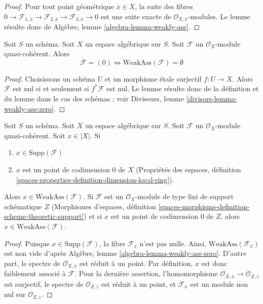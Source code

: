 \begin{proof}
Pour tout point géométrique $\overline{x} \in X$,
la suite des fibres
$0 \to \mathcal{F}_{1, \overline{x}} \to
\mathcal{F}_{2, \overline{x}} \to
\mathcal{F}_{3, \overline{x}} \to 0$
est une suite exacte de $\mathcal{O}_{X, \overline{x}}$-modules.
Le lemme résulte donc de
Algèbre, lemme \ref{algebra-lemma-weakly-ass}.
\end{proof}

\begin{lemma}
\label{lemma-weakly-ass-zero}
Soit $S$ un schéma. Soit $X$ un espace algébrique sur $S$.
Soit $\mathcal{F}$ un $\mathcal{O}_X$-module quasi-cohérent.
Alors
$$
\mathcal{F} = (0) \Leftrightarrow \text{WeakAss}(\mathcal{F}) = \emptyset
$$
\end{lemma}

\begin{proof}
Choisissons un schéma $U$ et un morphisme \'etale surjectif $f : U \to X$.
Alors $\mathcal{F}$ est nul si et seulement si $f^*\mathcal{F}$ est nul.
Le lemme résulte donc de la définition et du lemme dans le
cas des schémas ; voir
Diviseurs, lemme \ref{divisors-lemma-weakly-ass-zero}.
\end{proof}

\begin{lemma}
\label{lemma-minimal-support-in-weakly-ass}
Soit $S$ un schéma. Soit $X$ un espace algébrique sur $S$.
Soit $\mathcal{F}$ un $\mathcal{O}_X$-module quasi-cohérent.
Soit $x \in |X|$. Si
\begin{enumerate}
\item $x \in \text{Supp}(\mathcal{F})$
\item $x$ est un point de codimension $0$ de $X$
(Propriétés des espaces, définition
\ref{spaces-properties-definition-dimension-local-ring}).
\end{enumerate}
Alors $x \in \text{WeakAss}(\mathcal{F})$. Si $\mathcal{F}$
est un $\mathcal{O}_X$-module de type fini de support schématique $Z$
(Morphismes d'espaces, définition
\ref{spaces-morphisms-definition-scheme-theoretic-support})
et si $x$ est un point de codimension $0$ de $Z$, alors
$x \in \text{WeakAss}(\mathcal{F})$.
\end{lemma}

\begin{proof}
Puisque $x \in \text{Supp}(\mathcal{F})$, la fibre
$\mathcal{F}_{\overline{x}}$ n'est pas nulle. Ainsi,
$\text{WeakAss}(\mathcal{F}_{\overline{x}})$
est non vide d'après
Algèbre, lemme \ref{algebra-lemma-weakly-ass-zero}.
D'autre part, le spectre de $\mathcal{O}_{X, \overline{x}}$
est réduit à un point. Par définition, $x$ est donc faiblement associé à
$\mathcal{F}$. Pour la dernière assertion, l'homomorphisme
$\mathcal{O}_{X, \overline{x}} \to \mathcal{O}_{Z, \overline{z}}$
est surjectif, le spectre de $\mathcal{O}_{Z, \overline{z}}$
est réduit à un point, et $\mathcal{F}_{\overline{x}}$ est un
module non nul sur $\mathcal{O}_{Z, \overline{z}}$.
\end{proof}

